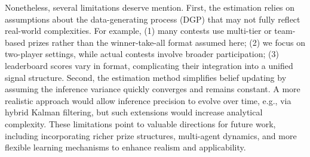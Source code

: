 \documentclass[mnsc]{informs3}
\begin{document}
Nonetheless, several limitations deserve mention.
First, the estimation relies on assumptions about the data-generating process (DGP) that may not fully reflect real-world complexities.
For example,
(1) many contests use multi-tier or team-based prizes rather than the winner-take-all format assumed here;
(2) we focus on two-player settings, while actual contests involve broader participation;
(3) leaderboard scores vary in format, complicating their integration into a unified signal structure.
Second, the estimation method simplifies belief updating by assuming the inference variance quickly converges and remains constant.
A more realistic approach would allow inference precision to evolve over time, e.g., via hybrid Kalman filtering, but such extensions would increase analytical complexity.
These limitations point to valuable directions for future work, including incorporating richer prize structures, multi-agent dynamics, and more flexible learning mechanisms to enhance realism and applicability.




%
%
%
\end{document}
